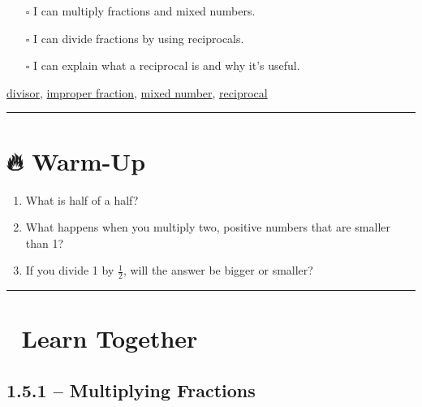 \documentclass[
  letterpaper,
  DIV=11,
  numbers=noendperiod]{scrreprt}
\providecommand{\tightlist}{%
  \setlength{\itemsep}{0pt}\setlength{\parskip}{0pt}}
\begin{document}
\begin{itemize}
\tightlist
\item[$\square$]
  I can multiply fractions and mixed numbers.
\item[$\square$]
  I can divide fractions by using reciprocals.
\item[$\square$]
  I can explain what a reciprocal is and why it's useful.
\end{itemize}

\href{./glossary.html\#glossary-divisor}{divisor},
\href{./glossary.html\#glossary-improper-fraction}{improper fraction},
\href{./glossary.html\#glossary-mixed-number}{mixed number},
\href{./glossary.html\#glossary-reciprocal}{reciprocal}

\begin{center}\rule{0.5\linewidth}{0.5pt}\end{center}

\section*{🔥 Warm-Up}\label{warm-up-4}


\begin{enumerate}
\def\labelenumi{\arabic{enumi}.}
\item
  What is half of a half?
\item
  What happens when you multiply two, positive numbers that are smaller
  than 1?
\item
  If you divide 1 by \(\frac{1}{2}\), will the answer be bigger or
  smaller?
\end{enumerate}

\begin{center}\rule{0.5\linewidth}{0.5pt}\end{center}

\section*{👥 Learn Together}\label{learn-together-4}


\subsection*{1.5.1 -- Multiplying
Fractions}\label{multiplying-fractions}
\end{document}
